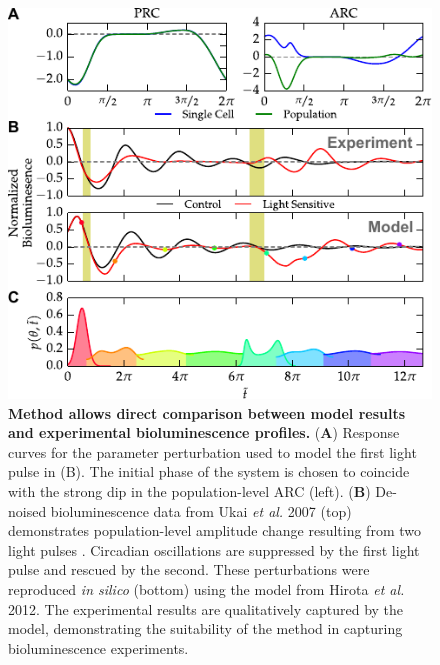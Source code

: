 \documentclass[11pt, letterpaper]{article}
\providecommand{\DIFadd}[1]{{\protect\color{blue}#1}} %
\providecommand{\DIFdel}[1]{{\protect\color{red}}}                      %
\providecommand{\DIFaddFL}[1]{\DIFadd{#1}} %
\providecommand{\DIFdelFL}[1]{\DIFdel{#1}} %
\providecommand{\DIFaddbeginFL}{} %
\providecommand{\DIFaddendFL}{} %
\providecommand{\DIFdelbeginFL}{} %
\providecommand{\DIFdelendFL}{} %
\begin{document}
\begin{figure}[tbp]
  \begin{center}
    \DIFaddbeginFL \includegraphics[width=.75\textwidth]{figures/figure_5.pdf}
    \DIFaddendFL \caption{
{\bfseries \DIFdelbeginFL \DIFdelFL{Probability-based population models accurately
    reproduce }\DIFdelendFL \DIFaddbeginFL \DIFaddFL{Method allows direct comparison between model results and }\DIFaddendFL experimental \DIFdelbeginFL \DIFdelFL{perturbations}\DIFdelendFL \DIFaddbeginFL \DIFaddFL{bioluminescence profiles}\DIFaddendFL .} 
({\bfseries A}) \DIFaddbeginFL \DIFaddFL{Response curves for the parameter perturbation used to model the first light pulse in (B).
The initial phase of the system is chosen to coincide with the strong dip in the population-level ARC (left).
(}{\bfseries \DIFaddFL{B}}\DIFaddFL{) }\DIFaddendFL De-noised bioluminescence data from Ukai {\itshape et al.} 2007 (top) demonstrates population-level amplitude change resulting from two light pulses \cite{Ukai2007}.
\DIFdelbeginFL \DIFdelFL{The }\DIFdelendFL \DIFaddbeginFL \DIFaddFL{Circadian oscillations are suppressed by the }\DIFaddendFL first \DIFaddbeginFL \DIFaddFL{light }\DIFaddendFL pulse \DIFdelbeginFL \DIFdelFL{desynchronizes the system, while
    }\DIFdelendFL \DIFaddbeginFL \DIFaddFL{and rescued by }\DIFaddendFL the second\DIFdelbeginFL \DIFdelFL{resynchronizes}\DIFdelendFL .
These perturbations were reproduced {\itshape in silico} (bottom) using the model from Hirota {\itshape et al.} 2012.
The experimental results are qualitatively captured by the model, demonstrating the suitability of the \DIFdelbeginFL \DIFdelFL{population model }\DIFdelendFL \DIFaddbeginFL \DIFaddFL{method }\DIFaddendFL in capturing bioluminescence experiments.
}
\end{center}
\end{figure}
\end{document}
